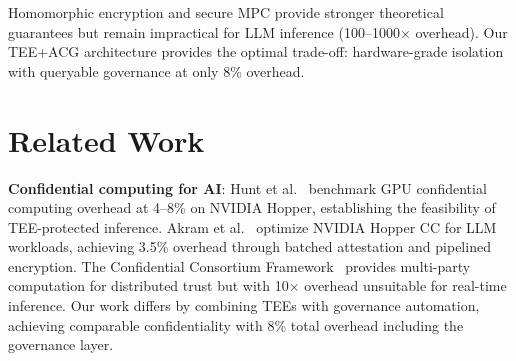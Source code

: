 \documentclass[conference,10pt]{IEEEtran}
\begin{document}
\begin{table}[!htbp]
\caption{Comparison with Alternative Trust Architectures}
\label{tab:compare}
\centering\scriptsize
{}
\end{table}

Homomorphic encryption and secure MPC provide stronger theoretical guarantees but remain impractical for LLM inference (100--1000$\times$ overhead). Our TEE+ACG architecture provides the optimal trade-off: hardware-grade isolation with queryable governance at only 8\% overhead.

\section{Related Work}
\label{sec:related}

\textbf{Confidential computing for AI}: Hunt et al.~\cite{hunt2024confidential} benchmark GPU confidential computing overhead at 4--8\% on NVIDIA Hopper, establishing the feasibility of TEE-protected inference. Akram et al.~\cite{akram2025ccgpu} optimize NVIDIA Hopper CC for LLM workloads, achieving 3.5\% overhead through batched attestation and pipelined encryption. The Confidential Consortium Framework~\cite{confidentialconsortium2023} provides multi-party computation for distributed trust but with 10$\times$ overhead unsuitable for real-time inference. Our work differs by combining TEEs with governance automation, achieving comparable confidentiality with 8\% total overhead including the governance layer.
\end{document}
